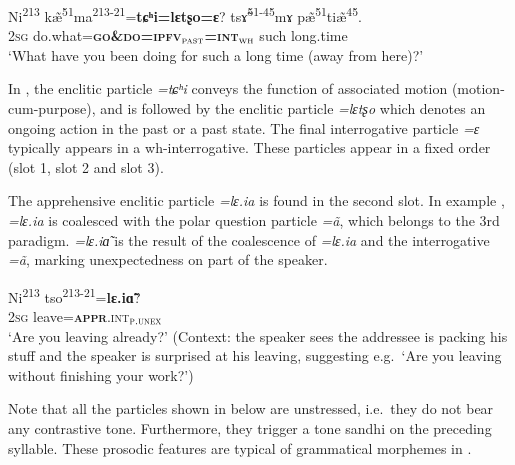 \documentclass[output=paper,colorlinks,citecolor=brown, language=chinese]{langscibook}
\begin{document}
\ea\label{ex:Song11}
\gll Ni\textsuperscript{213} kæ̃\textsuperscript{51}ma\textsuperscript{213-21}=\textbf{tɕʰi=lɛtʂo=ɛ}? tsɤ̃\textsuperscript{51-45}mɤ pæ̃\textsuperscript{51}tiæ̃\textsuperscript{45}. \\
\textsc{2sg} do.what=\textbf{\textsc{go\&do=ipfv$_{\mathrm{\textsc{past}}}$=int$_{\mathrm{\textsc{wh}}}$}} such long.time\\
\glt `What have you been doing for such a long time (away from here)?'
\z

\noindent In , the enclitic particle \textit{=tɕʰi} conveys the function of associated motion (motion-cum-purpose), and is followed by the enclitic particle \textit{=lɛtʂo} which denotes an ongoing action in the past or a past state. The final interrogative particle \textit{=ɛ} typically appears in a wh-interrogative. These particles appear in a fixed order (slot 1, slot 2 and slot 3).

The apprehensive enclitic particle \textit{=lɛ.ia} is found in the second slot. In example , \textit{=lɛ.ia} is coalesced with the polar question particle \textit{=ã}, which belongs to the 3rd paradigm. \textit{=lɛ.iɑ̃} is the result of the coalescence of \textit{=lɛ.ia} and the interrogative \textit{=ã}, marking unexpectedness on part of the speaker.

\ea\label{ex:Song12}
\gll Ni\textsuperscript{213} tso\textsuperscript{213-21}=\textbf{lɛ.iɑ̃}?  \\
\textsc{2sg} leave=\textsc{\textbf{appr}.int$_{\mathrm{\textsc{p.unex}}}$}\\
\glt `Are you leaving already?' (Context: the speaker sees the addressee is packing his stuff and the speaker is surprised at his leaving, suggesting e.g.\  `Are you leaving without finishing your work?') 
\z

 Note that all the particles shown in  below are unstressed, i.e.\  they do not bear any contrastive tone. Furthermore, they trigger a tone sandhi on the preceding syllable. These prosodic features are typical of grammatical morphemes in .
\end{document}
